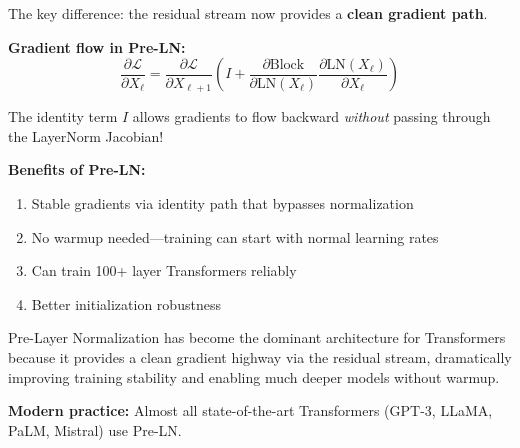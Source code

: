 \documentclass{article}
\begin{document}
The key difference: the residual stream now provides a \textbf{clean gradient path}.

\textbf{Gradient flow in Pre-LN:}
\[
\frac{\partial \mathcal{L}}{\partial X_\ell} = \frac{\partial \mathcal{L}}{\partial X_{\ell+1}} \left(I + \frac{\partial \text{Block}}{\partial \text{LN}(X_\ell)} \frac{\partial \text{LN}(X_\ell)}{\partial X_\ell}\right)
\]

The identity term $I$ allows gradients to flow backward \textit{without} passing through the LayerNorm Jacobian!

\begin{center}
\end{center}

\textbf{Benefits of Pre-LN:}
\begin{enumerate}
\item Stable gradients via identity path that bypasses normalization
\item No warmup needed---training can start with normal learning rates
\item Can train 100+ layer Transformers reliably
\item Better initialization robustness
\end{enumerate}

\begin{tcolorbox}[colback=green!5!white, colframe=green!50!black, title=Pre-LN: The Modern Standard]
Pre-Layer Normalization has become the dominant architecture for Transformers because it provides a clean gradient highway via the residual stream, dramatically improving training stability and enabling much deeper models without warmup.

\textbf{Modern practice:} Almost all state-of-the-art Transformers (GPT-3, LLaMA, PaLM, Mistral) use Pre-LN.
\end{tcolorbox}
\end{document}

